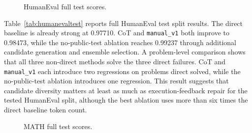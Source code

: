 \documentclass{article}
\begin{document}
\begin{figure}[t]
\caption{HumanEval full test scores.}
\label{fig:humanevalscores}
\vskip 0.08in
\begin{center}
\end{center}
\end{figure}

Table~\ref{tab:humanevaltest} reports full HumanEval test split results. The direct baseline is already strong at 0.97710. CoT and \texttt{manual\_v1} both improve to 0.98473, while the no-public-test ablation reaches 0.99237 through additional candidate generation and ensemble selection. A problem-level comparison shows that all three non-direct methods solve the three direct failures. CoT and \texttt{manual\_v1} each introduce two regressions on problems direct solved, while the no-public-test ablation introduces one regression. This result suggests that candidate diversity matters at least as much as execution-feedback repair for the tested HumanEval split, although the best ablation uses more than six times the direct baseline token count.

\begin{table}[t]
\caption{MATH full test split baseline results.}
\label{tab:mathtest}
\vskip 0.08in
\begin{center}
\begin{small}
\end{small}
\end{center}
\end{table}

\begin{figure}[t]
\caption{MATH full test scores.}
\label{fig:mathtestscores}
\vskip 0.08in
\begin{center}
\end{center}
\end{figure}
\end{document}
